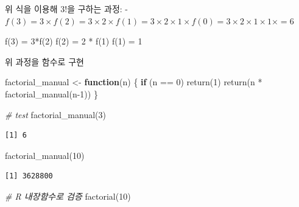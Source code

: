 \documentclass[
  11pt,
]{krantz}
\newenvironment{Shaded}{\begin{snugshade}}{\end{snugshade}}
\newcommand{\CommentTok}[1]{\textcolor[rgb]{0.37,0.37,0.37}{\textit{#1}}}
\newcommand{\ControlFlowTok}[1]{\textcolor[rgb]{0.27,0.27,0.27}{\textbf{#1}}}
\newcommand{\DecValTok}[1]{\textcolor[rgb]{0.06,0.06,0.06}{#1}}
\newcommand{\FunctionTok}[1]{\textcolor[rgb]{0,0,0}{#1}}
\newcommand{\NormalTok}[1]{#1}
\newcommand{\OtherTok}[1]{\textcolor[rgb]{0.37,0.37,0.37}{#1}}
\newcommand{\SpecialCharTok}[1]{\textcolor[rgb]{0,0,0}{#1}}
\begin{document}
위 식을 이용해 \(3!\)을 구하는 과정:
- \(f(3) = 3\times f(2) = 3\times 2 \times f(1) = 3 \times 2\times 1\times f(0) = 3\times 2\times 1\times 1\times = 6\)

\footnotesize

\begin{Shaded}
\begin{Highlighting}[]
\FunctionTok{f}\NormalTok{(}\DecValTok{3}\NormalTok{) }\OtherTok{=} \DecValTok{3}\SpecialCharTok{*}\FunctionTok{f}\NormalTok{(}\DecValTok{2}\NormalTok{)}
         \FunctionTok{f}\NormalTok{(}\DecValTok{2}\NormalTok{) }\OtherTok{=} \DecValTok{2} \SpecialCharTok{*} \FunctionTok{f}\NormalTok{(}\DecValTok{1}\NormalTok{)}
                    \FunctionTok{f}\NormalTok{(}\DecValTok{1}\NormalTok{) }\OtherTok{=} \DecValTok{1}
\end{Highlighting}
\end{Shaded}

\normalsize

위 과정을 함수로 구현

\footnotesize

\begin{Shaded}
\begin{Highlighting}[]
\NormalTok{factorial\_manual }\OtherTok{\textless{}{-}} \ControlFlowTok{function}\NormalTok{(n) \{}
  \ControlFlowTok{if}\NormalTok{ (n }\SpecialCharTok{==} \DecValTok{0}\NormalTok{) }\FunctionTok{return}\NormalTok{(}\DecValTok{1}\NormalTok{)}
  \FunctionTok{return}\NormalTok{(n }\SpecialCharTok{*} \FunctionTok{factorial\_manual}\NormalTok{(n}\DecValTok{{-}1}\NormalTok{))}
\NormalTok{\}}

\CommentTok{\# test}
\FunctionTok{factorial\_manual}\NormalTok{(}\DecValTok{3}\NormalTok{)}
\end{Highlighting}
\end{Shaded}

\begin{verbatim}
[1] 6
\end{verbatim}

\begin{Shaded}
\begin{Highlighting}[]
\FunctionTok{factorial\_manual}\NormalTok{(}\DecValTok{10}\NormalTok{)}
\end{Highlighting}
\end{Shaded}

\begin{verbatim}
[1] 3628800
\end{verbatim}

\begin{Shaded}
\begin{Highlighting}[]
\CommentTok{\# R 내장함수로 검증}
\FunctionTok{factorial}\NormalTok{(}\DecValTok{10}\NormalTok{)}
\end{Highlighting}
\end{Shaded}
\end{document}
